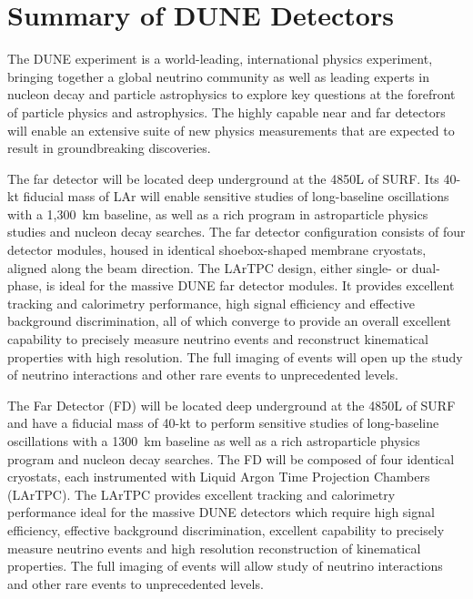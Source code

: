 \chapter{Summary of DUNE Detectors}
\label{ch:detectors-summary}

The DUNE experiment is a world-leading, international physics
experiment, bringing together a global %
neutrino community as well
as leading experts in nucleon decay and particle astrophysics to
explore key questions at the forefront of particle physics and
astrophysics. The highly capable  near and far detectors will enable %
an extensive suite of new physics measurements %
that are expected to result in %
groundbreaking
discoveries.

The far detector will be located deep underground at the 4850L of
SURF.  Its 40-kt fiducial mass of LAr will enable sensitive studies of
long-baseline oscillations with a 1,300~km baseline, as well as a rich
program in astroparticle physics studies and nucleon decay searches. 
The far detector configuration consists of 
four detector modules, housed in 
identical shoebox-shaped membrane cryostats, aligned along the beam direction. The LArTPC design, either
single- or dual-phase,  is ideal for the massive
DUNE far detector modules.  It provides
excellent tracking and calorimetry performance, high signal efficiency and effective
background discrimination, all of which converge to provide an overall excellent capability 
to precisely measure neutrino events and reconstruct kinematical
properties with high resolution. The full imaging of events will open up the study of neutrino
interactions and other rare events to unprecedented levels. 


The Far Detector (FD) will be located deep underground at the 4850L of
SURF and have a fiducial mass of 40-kt to perform sensitive studies of
long-baseline oscillations with a 1300~km baseline as well as a rich
astroparticle physics program and nucleon decay searches. The FD
will be composed of four identical cryostats, each instrumented with
Liquid Argon Time Projection Chambers (LArTPC). The LArTPC provides
excellent tracking and calorimetry performance ideal for the massive
DUNE detectors which require high signal efficiency, effective
background discrimination, excellent capability to precisely measure
neutrino events and high resolution reconstruction of kinematical
properties. The full imaging of events will allow study of neutrino
interactions and other rare events to unprecedented levels.

